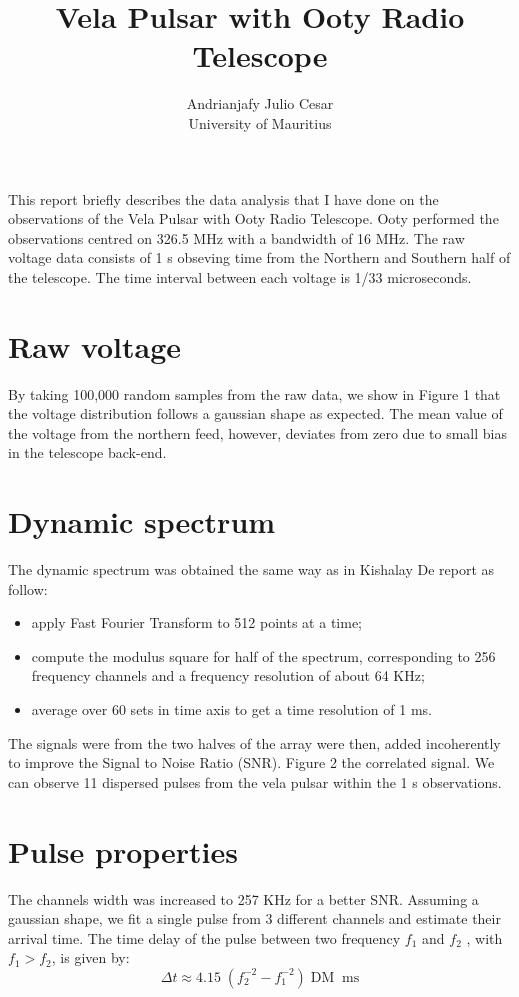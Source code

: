 \documentclass[12pt]{article}
\title{Vela Pulsar with Ooty Radio Telescope}
\author{Andrianjafy Julio Cesar \\ University of Mauritius}
\begin{document}
\maketitle
\paragraph{}
This report briefly describes the data analysis that I have done on the observations of the Vela Pulsar with Ooty Radio Telescope. Ooty performed the observations centred on 326.5 MHz with a bandwidth of 16 MHz. The raw voltage data consists of 1 s obseving time from the Northern and Southern half of the telescope. The time interval between each voltage is 1/33 microseconds.
\begin{multicols}{2}
\section{Raw voltage}

By taking 100,000 random samples from the raw data, we show in Figure 1  that the voltage distribution follows a gaussian shape as expected. The mean value of the voltage from the northern feed, however, deviates from zero due to small bias in the telescope back-end.

\section{Dynamic spectrum}
The dynamic spectrum was obtained the same way as in Kishalay De report as follow:
\begin{itemize}
	\item apply Fast Fourier Transform to 512 points at a time; 
	\item compute the modulus square for half of the spectrum, corresponding to 256 frequency channels and a frequency resolution of about 64 KHz;
	\item average over 60 sets in time axis to get a time resolution of 1 ms.	
	
\end{itemize}

The signals were from the two halves of the array were then, added incoherently to improve the Signal to Noise Ratio (SNR). Figure 2 the correlated signal. We can observe 11 dispersed pulses from the vela pulsar within the 1 s observations. 

\section{Pulse properties}
The channels width was increased to 257 KHz for a better SNR. Assuming a gaussian shape, we fit a single pulse from 3 different channels and estimate their arrival time. The time delay of the pulse between two frequency $f_1$ and $f_2$ , with $f_1 > f_2$,  is given by: 
\begin{equation}
\Delta t \approx 4.15 \;(f_2^{-2} - f_1^{-2})\; \mbox{DM} \;\; \mbox{ms}
\end{equation}


\end{multicols}
\end{document}
